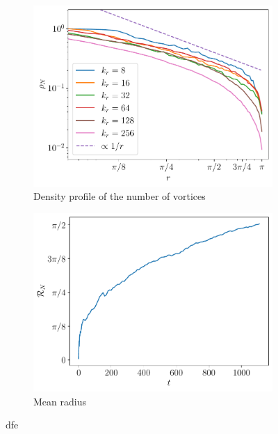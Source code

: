 \documentclass[../main.tex]{subfiles}
\begin{document}
\begin{figure}[ht]
	\centering
	\begin{subfigure}{0.44\textwidth}
		\centering
		\includegraphics[width=\textwidth]{images/NumVortices.pdf}
		\caption{Density profile of the number of vortices}
	\end{subfigure}\hspace{0.04\textwidth}
	\begin{subfigure}{0.44\textwidth}
		\centering
		\includegraphics[width=\textwidth]{images/NumVorticesMeanRadius.pdf}
		\caption{Mean radius}
	\end{subfigure}
	\caption{dfe}\label{fig:pointvortices}
\end{figure}
\end{document}
